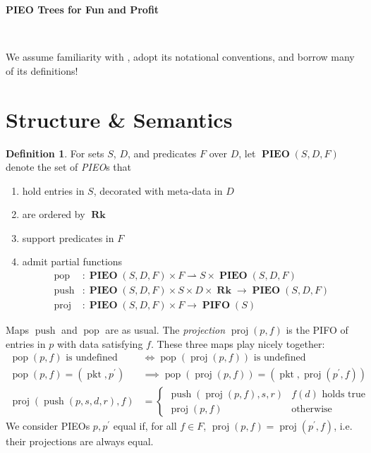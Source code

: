 \documentclass{amsart}
\makeatletter
\DeclareMathOperator{\halfto}{\rightharpoonup}
\DeclareMathOperator{\pkt}{\mathrm{pkt}}
\DeclareMathOperator{\push}{\mathrm{push}}
\DeclareMathOperator{\pop}{\mathrm{pop}}
\DeclareMathOperator{\proj}{\mathrm{proj}}
\DeclareMathOperator{\Rk}{\mathbf{Rk}}
\DeclareMathOperator{\PIEO}{\mathbf{PIEO}}
\DeclareMathOperator{\PIFO}{\mathbf{PIFO}}
\theoremstyle{definition}
\newtheorem{dfn}[thm]{Definition}
\newcommand{\reqnomode}{\tagsleft@false\let\veqno\@@eqno}
\makeatother
\begin{document}
\pagestyle{empty}

{\LARGE \textbf{PIEO Trees for Fun and Profit}}

\hrulefill\\

\reqnomode

We assume familiarity with \cite{OG}, adopt its notational conventions, and borrow many of its definitions!

\section{Structure \& Semantics}

\begin{dfn}
    \label{dfn:pieo}
    For sets $S$, $D$, and predicates $F$ over $D$,
    let $\PIEO(S, D, F)$ denote the set of \emph{PIEO}s that
    \begin{enumerate}
        \item hold entries in $S$, decorated with meta-data in $D$
        \item are ordered by $\Rk$
        \item support predicates in $F$
        \item admit partial functions 
        \begin{align*}
            \pop &: \PIEO(S, D, F) \times F \halfto S \times \PIEO(S, D, F) \\
            \push &: \PIEO(S, D, F) \times S \times D \times \Rk \to \PIEO(S, D, F) \\
            \proj &: \PIEO(S, D, F) \times F \to \PIFO(S)
        \end{align*}
    \end{enumerate}
    Maps $\push$ and $\pop$ are as usual.
    The \emph{projection} $\proj(p, f)$ is the PIFO of entries in $p$ with data satisfying $f$.
    These three maps play nicely together: 
    \begin{align}
        \pop(p, f) \text{ is undefined} &\iff \pop(\proj(p, f)) \text{ is undefined} \label{eq:pieo1}\\
        \pop(p, f) = (\pkt, p^\prime) &\implies \pop(\proj(p, f)) = (\pkt, \proj(p^\prime, f)) \label{eq:pieo2}\\
        \proj(\push(p, s, d, r), f) &= 
        \begin{cases}
            \push(\proj(p, f), s, r) & f(d) \text{ holds true}\\
            \proj(p, f) & \text{otherwise}
        \end{cases}
        \label{eq:pieo3}
    \end{align}
    We consider PIEOs $p, p^\prime$ equal if, for all $f \in F$, $\proj(p,f) = \proj(p^\prime, f)$, i.e. their projections are always equal.


\end{dfn}
\end{document}

